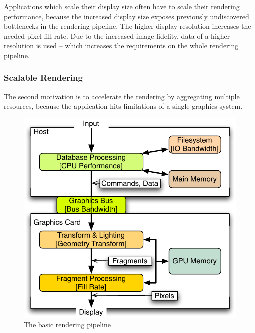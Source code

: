 \documentclass[10pt,a4paper]{scrartcl}
\begin{document}
Applications which scale their display size often have to scale
their rendering performance, because the increased display size exposes
previously undiscovered bottlenecks in the rendering pipeline. The higher
display resolution increases the needed pixel fill rate. Due to the increased
image fidelity, data of a higher resolution is used -- which increases
the requirements on the whole rendering pipeline.

\subsubsection{Scalable Rendering}
The second motivation is to accelerate the rendering by aggregating
multiple resources, because the application hits limitations of a single
graphics system.

\begin{figure}[ht]
\centering
\includegraphics[width=0.45\columnwidth]{images/pipeline.pdf}
\caption{The basic rendering pipeline}
\label{FIG_pipeline}
\end{figure}
\end{document}
